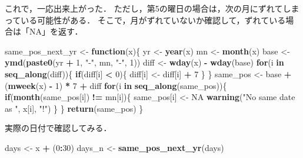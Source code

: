 \documentclass[
]{article}
\newenvironment{Shaded}{\begin{snugshade}}{\end{snugshade}}
\newcommand{\ConstantTok}[1]{\textcolor[rgb]{0.56,0.35,0.01}{#1}}
\newcommand{\ControlFlowTok}[1]{\textcolor[rgb]{0.13,0.29,0.53}{\textbf{#1}}}
\newcommand{\DecValTok}[1]{\textcolor[rgb]{0.00,0.00,0.81}{#1}}
\newcommand{\FunctionTok}[1]{\textcolor[rgb]{0.13,0.29,0.53}{\textbf{#1}}}
\newcommand{\NormalTok}[1]{#1}
\newcommand{\OtherTok}[1]{\textcolor[rgb]{0.56,0.35,0.01}{#1}}
\newcommand{\SpecialCharTok}[1]{\textcolor[rgb]{0.81,0.36,0.00}{\textbf{#1}}}
\newcommand{\StringTok}[1]{\textcolor[rgb]{0.31,0.60,0.02}{#1}}
\begin{document}
これで，一応出来上がった．
ただし，第5の曜日の場合は，次の月にずれてしまっている可能性がある．
そこで，月がずれていないか確認して，ずれている場合は「NA」を返す．

\begin{Shaded}
\begin{Highlighting}[]
\NormalTok{same\_pos\_next\_yr }\OtherTok{\textless{}{-}} \ControlFlowTok{function}\NormalTok{(x)\{}
\NormalTok{  yr }\OtherTok{\textless{}{-}} \FunctionTok{year}\NormalTok{(x)}
\NormalTok{  mn }\OtherTok{\textless{}{-}} \FunctionTok{month}\NormalTok{(x)}
\NormalTok{  base }\OtherTok{\textless{}{-}} \FunctionTok{ymd}\NormalTok{(}\FunctionTok{paste0}\NormalTok{(yr }\SpecialCharTok{+} \DecValTok{1}\NormalTok{, }\StringTok{"{-}"}\NormalTok{, mn, }\StringTok{"{-}"}\NormalTok{, }\DecValTok{1}\NormalTok{))}
\NormalTok{  diff }\OtherTok{\textless{}{-}} \FunctionTok{wday}\NormalTok{(x) }\SpecialCharTok{{-}} \FunctionTok{wday}\NormalTok{(base)}
  \ControlFlowTok{for}\NormalTok{(i }\ControlFlowTok{in} \FunctionTok{seq\_along}\NormalTok{(diff))\{}
    \ControlFlowTok{if}\NormalTok{(diff[i] }\SpecialCharTok{\textless{}} \DecValTok{0}\NormalTok{)\{ diff[i] }\OtherTok{\textless{}{-}}\NormalTok{ diff[i] }\SpecialCharTok{+} \DecValTok{7}\NormalTok{ \}}
\NormalTok{  \}}
\NormalTok{  same\_pos }\OtherTok{\textless{}{-}}\NormalTok{ base }\SpecialCharTok{+}\NormalTok{ (}\FunctionTok{mweek}\NormalTok{(x) }\SpecialCharTok{{-}} \DecValTok{1}\NormalTok{) }\SpecialCharTok{*} \DecValTok{7} \SpecialCharTok{+}\NormalTok{ diff}
  \ControlFlowTok{for}\NormalTok{(i }\ControlFlowTok{in} \FunctionTok{seq\_along}\NormalTok{(same\_pos))\{}
    \ControlFlowTok{if}\NormalTok{(}\FunctionTok{month}\NormalTok{(same\_pos[i]) }\SpecialCharTok{!=}\NormalTok{ mn[i])\{}
\NormalTok{      same\_pos[i] }\OtherTok{\textless{}{-}} \ConstantTok{NA}
      \FunctionTok{warning}\NormalTok{(}\StringTok{"No same date as "}\NormalTok{, x[i], }\StringTok{"!"}\NormalTok{)}
\NormalTok{    \}}
\NormalTok{  \}}
  \FunctionTok{return}\NormalTok{(same\_pos)}
\NormalTok{\}}
\end{Highlighting}
\end{Shaded}

実際の日付で確認してみる．

\begin{Shaded}
\begin{Highlighting}[]
\NormalTok{days   }\OtherTok{\textless{}{-}}\NormalTok{ x }\SpecialCharTok{+}\NormalTok{ (}\DecValTok{0}\SpecialCharTok{:}\DecValTok{30}\NormalTok{)}
\NormalTok{days\_n }\OtherTok{\textless{}{-}} \FunctionTok{same\_pos\_next\_yr}\NormalTok{(days)}
\end{Highlighting}
\end{Shaded}
\end{document}
